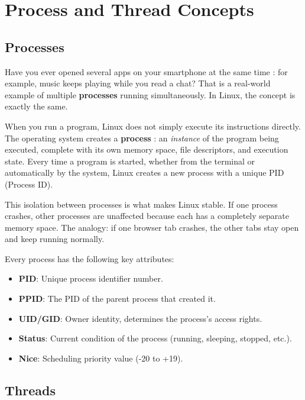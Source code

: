 \section{Process and Thread Concepts}
\label{sec:process-concept}

\subsection{Processes}

Have you ever opened several apps on your smartphone at the same time : for
example, music keeps playing while you read a chat? That is a real-world
example of multiple \textbf{processes} running simultaneously. In Linux, the
concept is exactly the same.

When you run a program, Linux does not simply execute its instructions
directly. The operating system creates a \textbf{process} : an \textit{instance}
of the program being executed, complete with its own memory space, file
descriptors, and execution state. Every time a program is started, whether
from the terminal or automatically by the system, Linux creates a new process
with a unique PID (Process ID).

This isolation between processes is what makes Linux stable. If one process
crashes, other processes are unaffected because each has a completely separate
memory space. The analogy: if one browser tab crashes, the other tabs stay
open and keep running normally.

Every process has the following key attributes:

\begin{itemize}
  \item \textbf{PID}: Unique process identifier number.
  \item \textbf{PPID}: The PID of the parent process that created it.
  \item \textbf{UID/GID}: Owner identity, determines the process's access rights.
  \item \textbf{Status}: Current condition of the process (running, sleeping, stopped, etc.).
  \item \textbf{Nice}: Scheduling priority value (-20 to +19).
\end{itemize}

\subsection{Threads}

